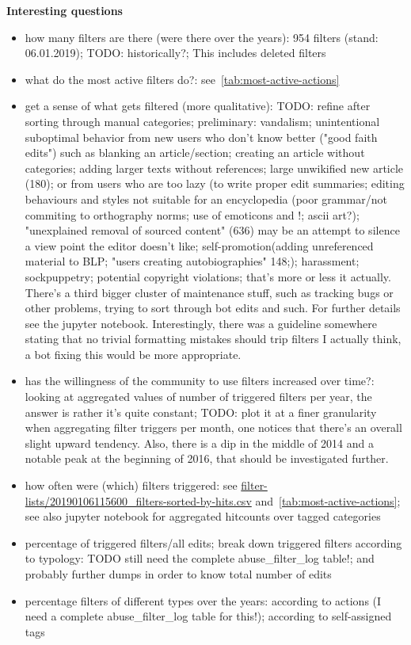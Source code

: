 \textbf{Interesting questions}
\begin{itemize}
    \item how many filters are there (were there over the years): 954 filters (stand: 06.01.2019); TODO: historically?; This includes deleted filters
    \item what do the most active filters do?: see~\ref{tab:most-active-actions}
    \item get a sense of what gets filtered (more qualitative): TODO: refine after sorting through manual categories; preliminary: vandalism; unintentional suboptimal behavior from new users who don't know better ("good faith edits") such as blanking an article/section; creating an article without categories; adding larger texts without references; large unwikified new article (180); or from users who are too lazy (to write proper edit summaries; editing behaviours and styles not suitable for an encyclopedia (poor grammar/not commiting to orthography norms; use of emoticons and !; ascii art?); "unexplained removal of sourced content" (636) may be an attempt to silence a view point the editor doesn't like; self-promotion(adding unreferenced material to BLP; "users creating autobiographies" 148;); harassment; sockpuppetry; potential copyright violations; that's more or less it actually. There's a third bigger cluster of maintenance stuff, such as tracking bugs or other problems, trying to sort through bot edits and such. For further details see the jupyter notebook.
        Interestingly, there was a guideline somewhere stating that no trivial formatting mistakes should trip filters\cite{Wikipedia:EditFilterRequested}
        I actually think, a bot fixing this would be more appropriate.
    \item has the willingness of the community to use filters increased over time?: looking at aggregated values of number of triggered filters per year, the answer is rather it's quite constant; TODO: plot it at a finer granularity
        when aggregating filter triggers per month, one notices that there's an overall slight upward tendency.
        Also, there is a dip in the middle of 2014 and a notable peak at the beginning of 2016, that should be investigated further.
    \item how often were (which) filters triggered: see \url{filter-lists/20190106115600_filters-sorted-by-hits.csv} and~\ref{tab:most-active-actions}; see also jupyter notebook for aggregated hitcounts over tagged categories
    \item percentage of triggered filters/all edits; break down triggered filters according to typology: TODO still need the complete abuse\_filter\_log table!; and probably further dumps in order to know total number of edits
    \item percentage filters of different types over the years: according to actions (I need a complete abuse\_filter\_log table for this!); according to self-assigned tags %
\end{itemize}

